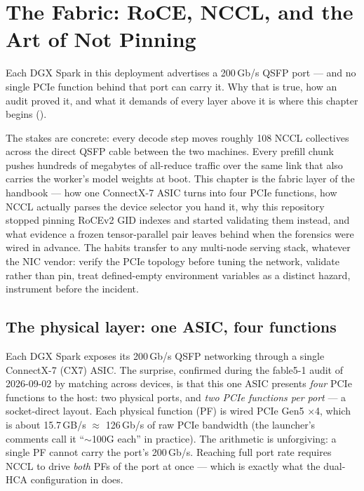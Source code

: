 \chapter{The Fabric: RoCE, NCCL, and the Art of Not Pinning}
\label{ch:fabric}

Each DGX Spark in this deployment advertises a 200\,Gb/s QSFP port --- and no
single PCIe function behind that port can carry it. Why that is true, how an
audit proved it, and what it demands of every layer above it is where this
chapter begins ().

The stakes are concrete: every decode step moves roughly 108 NCCL
collectives across the direct QSFP cable between the two machines. Every
prefill chunk pushes hundreds of megabytes of all-reduce traffic over the
same link that also carries the worker's model weights at boot. This chapter
is the fabric layer of the handbook --- how one ConnectX-7 ASIC turns into
four PCIe functions, how NCCL actually parses the device selector you hand
it, why this repository stopped pinning RoCEv2 GID indexes and started validating
them instead, and what evidence a frozen tensor-parallel pair leaves behind
when the forensics were wired in advance. The habits transfer to any
multi-node serving stack, whatever the NIC vendor: verify the PCIe topology
before tuning the network, validate rather than pin, treat defined-empty
environment variables as a distinct hazard, instrument before the incident.

\section{The physical layer: one ASIC, four functions}
\label{sec:fabric-physical}

Each DGX Spark exposes its 200\,Gb/s QSFP networking through a single
ConnectX-7 (CX7) ASIC. The surprise, confirmed during the fable5-1 audit of
2026-09-02 by matching  across devices, is that this one
ASIC presents \emph{four} PCIe functions to the host: two physical ports, and
\emph{two PCIe functions per port} --- a socket-direct layout. Each physical
function (PF) is wired PCIe Gen5 $\times$4, which is about 15.7\,GB/s
$\approx$ 126\,Gb/s of raw PCIe bandwidth (the launcher's comments call it
``$\sim$100G each'' in practice). The arithmetic is unforgiving: a single PF
cannot carry the port's 200\,Gb/s. Reaching full port rate requires NCCL to
drive \emph{both} PFs of the port at once --- which is exactly what the
dual-HCA configuration in  does.

